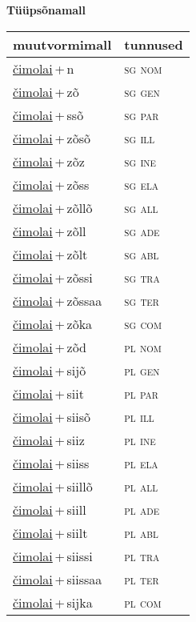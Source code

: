 
\vspace{1.8em}
\begin{minipage}{\textwidth}
\textbf{Tüüpsõnamall \,}\\

\begin{sideways}
\begin{tabular}{l l}
muutvormimall & tunnused \\
\hline
\underline{čimolai}\,+\,n & \textsc{ sg nom } \\
\underline{čimolai}\,+\,zõ & \textsc{ sg gen } \\
\underline{čimolai}\,+\,ssõ & \textsc{ sg par } \\
\underline{čimolai}\,+\,zõsõ & \textsc{ sg ill } \\
\underline{čimolai}\,+\,zõz & \textsc{ sg ine } \\
\underline{čimolai}\,+\,zõss & \textsc{ sg ela } \\
\underline{čimolai}\,+\,zõllõ & \textsc{ sg all } \\
\underline{čimolai}\,+\,zõll & \textsc{ sg ade } \\
\underline{čimolai}\,+\,zõlt & \textsc{ sg abl } \\
\underline{čimolai}\,+\,zõssi & \textsc{ sg tra } \\
\underline{čimolai}\,+\,zõssaa & \textsc{ sg ter } \\
\underline{čimolai}\,+\,zõka & \textsc{ sg com } \\
\underline{čimolai}\,+\,zõd & \textsc{ pl nom } \\
\underline{čimolai}\,+\,sijõ & \textsc{ pl gen } \\
\underline{čimolai}\,+\,siit & \textsc{ pl par } \\
\underline{čimolai}\,+\,siisõ & \textsc{ pl ill } \\
\underline{čimolai}\,+\,siiz & \textsc{ pl ine } \\
\underline{čimolai}\,+\,siiss & \textsc{ pl ela } \\
\underline{čimolai}\,+\,siillõ & \textsc{ pl all } \\
\underline{čimolai}\,+\,siill & \textsc{ pl ade } \\
\underline{čimolai}\,+\,siilt & \textsc{ pl abl } \\
\underline{čimolai}\,+\,siissi & \textsc{ pl tra } \\
\underline{čimolai}\,+\,siissaa & \textsc{ pl ter } \\
\underline{čimolai}\,+\,sijka & \textsc{ pl com } \\
\end{tabular}
\end{sideways}
\label{tab:tüüpsõnamall-čimolain}

\end{minipage}

